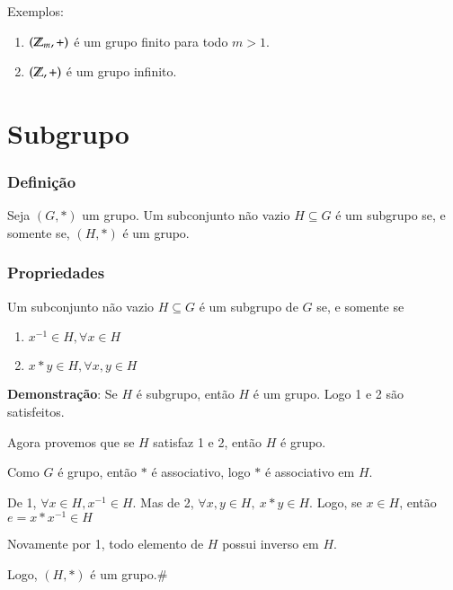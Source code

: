 Exemplos:
\begin{enumerate}
\item $(\mathbb{Z}_m, +)$ {\'e} um grupo finito para todo $m>1$.
\item $(\mathbb{Z}, +)$ {\'e} um grupo infinito.
\end{enumerate}

\section{Subgrupo}
\subsubsection{Defini{\c c}{\~a}o}

\begin{definicao}[Subgrupo]
Seja $(G,*)$ um grupo. Um subconjunto n{\~a}o vazio $H\subseteq G$ {\'e} um subgrupo se, e somente se, $(H,*)$ {\'e} um grupo.
\end{definicao}

\subsubsection{Propriedades}
\begin{proposicao}
Um subconjunto n{\~a}o vazio $H\subseteq G$ {\'e} um subgrupo de $G$ se, e somente se
\begin{enumerate}
\item $x^{-1}\in H,\forall x\in H$
\item $x*y\in H,\forall x,y\in H$
\end{enumerate}
\end{proposicao}

\textbf{Demonstra{\c c}{\~a}o}: Se $H$ {\'e} subgrupo, ent{\~a}o $H$ {\'e} um grupo. Logo 1 e 2 s{\~a}o satisfeitos.

Agora provemos que se $H$ satisfaz 1 e 2, ent{\~a}o $H$ {\'e} grupo.

Como $G$ {\'e} grupo, ent{\~a}o $*$ {\'e} associativo, logo $*$ {\'e} associativo em $H$.

De 1, $\forall x\in H,x^{-1}\in H$. Mas de 2, $\forall x,y\in H,\ x*y\in H$. Logo, se $x\in H$, ent{\~a}o $e=x*x^{-1}\in H$

Novamente por 1, todo elemento de $H$ possui inverso em $H$.

Logo, $(H,*)$ {\'e} um grupo.\#

